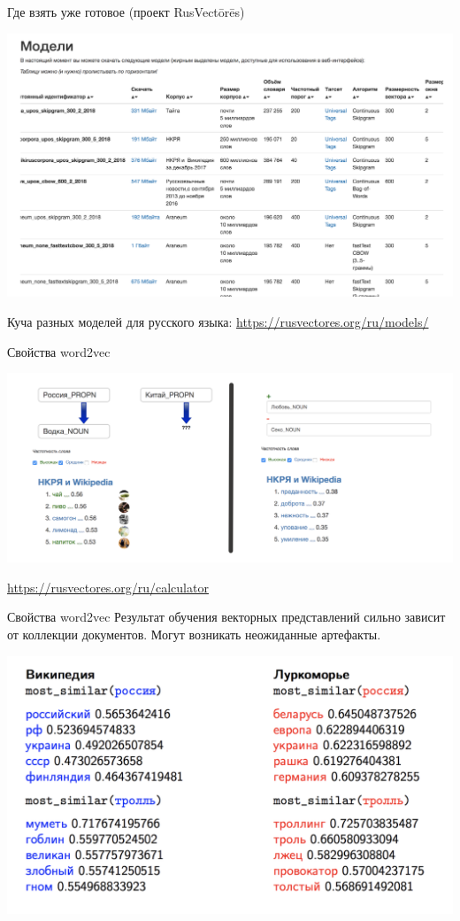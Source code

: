 \documentclass[notes,12pt, aspectratio=169]{beamer}
\begin{document}
	
\begin{frame}{Где взять уже готовое (проект RusVectōrēs)}
	\begin{center}
		\includegraphics[width=.7\linewidth]{rusvec_models.png}
	\end{center}
	
		\vfill
	
		\footnotesize Куча разных моделей для русского языка:  {\color{blue} \url{https://rusvectores.org/ru/models/}}
\end{frame} 


\begin{frame}{Свойства word2vec}
	\begin{center}
		\includegraphics[width=.85\linewidth]{rusvec_calc2.png}
	\end{center}
	\vfill
	\footnotesize  {\color{blue} \url{https://rusvectores.org/ru/calculator}}
\end{frame} 


\begin{frame}{Свойства word2vec}
	Результат обучения векторных представлений сильно зависит от коллекции документов. \alert{Могут возникать неожиданные артефакты.}
	
	\begin{center}
		\includegraphics[width=.65\linewidth]{wikilurk.png}
	\end{center}
\end{frame} 
\end{document}
